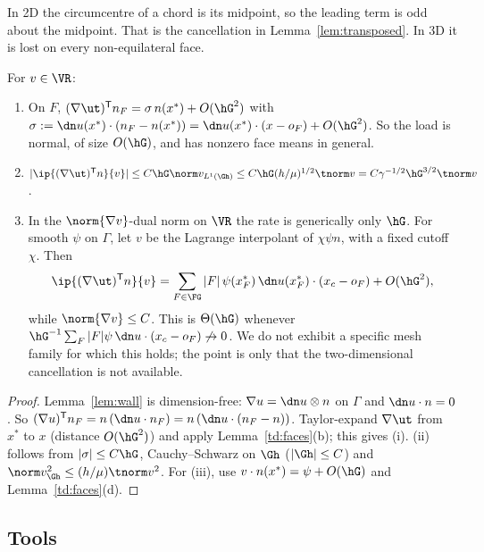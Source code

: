 In 2D the circumcentre of a chord is its midpoint, so the leading term is odd about the midpoint. That is the cancellation in Lemma~\ref{lem:transposed}. In 3D it is lost on every non-equilateral face.

\begin{proposition}\label{td:transposed}
For $v\in\VR$:
\begin{enumerate}[label=(\roman*)]
\item On $F$, $(\nabla\ut)^{\mathsf T}n_F=\sigma\,n(x^\ast)+O(\hG^2)$ with $\sigma:=\dn u(x^\ast)\cdot(n_F-n(x^\ast))=\dn u(x^\ast)\cdot(x-o_F)+O(\hG^2)$. So the load is normal, of size $O(\hG)$, and has nonzero face means in general.
\item $|\ip{(\nabla\ut)^{\mathsf T}n}{v}|\le C\hG\norm v_{L^1(\Gh)}\le C\hG(h/\mu)^{1/2}\tnorm v=C\gamma^{-1/2}\hG^{3/2}\tnorm v$.
\item In the $\norm{\nabla v}$-dual norm on $\VR$ the rate is generically only $\hG$. For smooth $\psi$ on $\Gamma$, let $v$ be the Lagrange interpolant of $\chi\psi n$, with a fixed cutoff $\chi$. Then
\[
\ip{(\nabla\ut)^{\mathsf T}n}{v}=\sum_{F\in\FG}|F|\,\psi(x_F^\ast)\,\dn u(x_F^\ast)\cdot(x_c-o_F)+O(\hG^2),
\]
while $\norm{\nabla v}\le C$. This is $\Theta(\hG)$ whenever $\hG^{-1}\sum_F|F|\psi\,\dn u\cdot(x_c-o_F)\not\to0$. We do not exhibit a specific mesh family for which this holds; the point is only that the two-dimensional cancellation is not available.
\end{enumerate}
\end{proposition}

\begin{proof}
Lemma~\ref{lem:wall} is dimension-free: $\nabla u=\dn u\otimes n$ on $\Gamma$ and $\dn u\cdot n=0$. So $(\nabla u)^{\mathsf T}n_F=n\,(\dn u\cdot n_F)=n\,(\dn u\cdot(n_F-n))$. Taylor-expand $\nabla\ut$ from $x^\ast$ to $x$ (distance $O(\hG^2)$) and apply Lemma~\ref{td:faces}(b); this gives (i). (ii) follows from $|\sigma|\le C\hG$, Cauchy--Schwarz on $\Gh$ ($|\Gh|\le C$) and $\norm v^2_{\Gh}\le(h/\mu)\tnorm v^2$. For (iii), use $v\cdot n(x^\ast)=\psi+O(\hG)$ and Lemma~\ref{td:faces}(d).
\end{proof}

\subsection{Tools}

